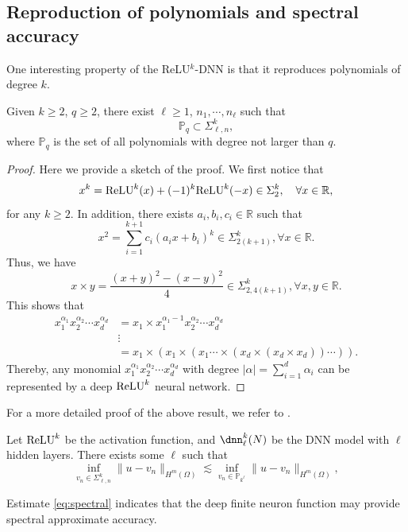 \subsection{Reproduction of polynomials and spectral accuracy}
One interesting property of the ReLU$^k$-DNN is that it reproduces
polynomials of degree $k$.  
\begin{lemma}
Given $k\ge 2$, $q\ge 2$, there exist $\ell\ge 1$, $n_1, \cdots, n_\ell$ such that
$$
\mathbb{P}_q\subset \Sigma^k_{\ell,n},
$$
where $\mathbb{P}_q$ is the set of all polynomials with degree not larger than $q$.
\end{lemma}
\begin{proof}
	Here we provide a sketch of the proof. We first notice that
	$$
	x^k = {\rm ReLU}^k(x) + (-1)^k{\rm ReLU}^k(-x) \in \Sigma^k_{2}, \quad \forall x \in \mathbb{R},
	$$
	for any $k\ge2$. In addition, there exists $a_i, b_i, c_i \in \mathbb{R}$ such that
	$$
	x^2 = \sum_{i=1}^{k+1} c_i(a_i x + b_i)^k  \in \Sigma^k_{2(k+1)}, \forall x \in \mathbb{R}.
	$$
	Thus, we have
	$$
	x\times y = \frac{(x+y)^2 - (x-y)^2}{4} \in \Sigma^k_{2, 4(k+1)}, \forall x,y \in \mathbb{R}.
	$$
	This shows that
	\begin{equation}\label{key}
	\begin{split}
	x_1^{\alpha_1}x_2^{\alpha_2}\cdots x_d^{\alpha_d} 
	&= x_1 \times x_1^{\alpha_1-1}x_2^{\alpha_2}\cdots x_d^{\alpha_d} \\
	&\vdots \\
	&= x_1\times \left(x_1 \times \left(x_1 \cdots \times \left(x_d\times (x_d \times x_d)\right)\cdots\right)\right).
	\end{split}
	\end{equation}
	Thereby, any monomial $x_1^{\alpha_1}x_2^{\alpha_2}\cdots x_d^{\alpha_d}$ with degree $|\alpha| = \sum_{i=1}^d \alpha_i$ can be represented by a deep ${\rm ReLU}^k$ neural network.
\end{proof}
For a more detailed proof of the above result, we refer to \cite{li2019better}. 

\begin{theorem}\label{thm:spectral}
Let  ${\rm ReLU}^k$ be the activation function, and $\dnn_\ell^k(N)$ be the DNN model with $\ell$ hidden layers. 
There exists some $\ell$ such that
\begin{equation}\label{eq:spectral}
\inf_{v_n\in \Sigma^k_{\ell,n}}\|u-v_n \|_{H^m(\Omega)} \lesssim
\inf_{v_n\in \mathbb{P}_{k^\ell}} \|u-v_n\|_{H^m(\Omega)},
\end{equation} 
\end{theorem}
Estimate \eqref{eq:spectral} indicates that the deep finite neuron function may provide spectral approximate accuracy.

